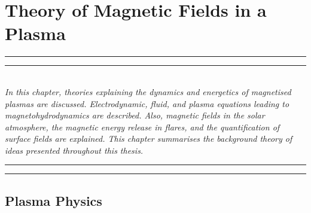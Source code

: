 
\chapter{Theory of Magnetic Fields in a Plasma} %
\label{chapter:theory}

\graphicspath{{1b_theory/figures/EPS/}{1b_theory/figures/}}

\glsresetall

\hrule height 1mm
\vspace{0.5mm}
\hrule height 0.4mm 
\noindent 
\\ {\it 
In this chapter, theories explaining the dynamics and energetics of magnetised plasmas are discussed. Electrodynamic, fluid, and plasma equations leading to magnetohydrodynamics are described. Also, magnetic fields in the solar atmosphere, the magnetic energy release in flares, and the quantification of surface fields are explained. This chapter summarises the background theory of ideas presented throughout this thesis.
}
\\ 
\hrule height 0.4mm
\vspace{0.5mm}
\hrule height 1mm 
\vspace{1.5cm}

\section{Plasma Physics}


